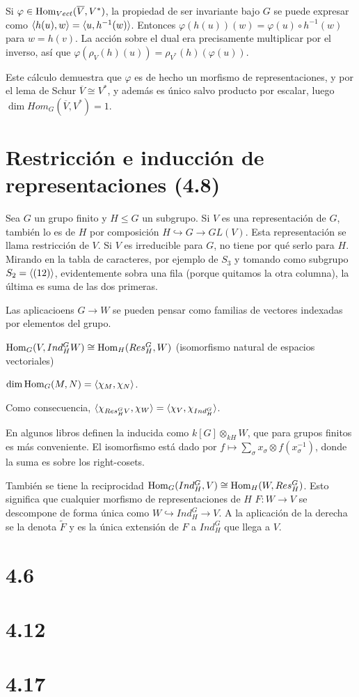 \documentclass[ANAyTR.tex]{subfiles}
\begin{document}
Si $\varphi\in\operatorname{Hom}_{Vect}(\overline{V},V^*)$, la propiedad de ser invariante bajo $G$ se puede expresar como $\langle{h(u),w}\rangle=\langle{u,h^{-1}(w)}\rangle$. Entonces $\varphi(h(u))(w)=\varphi(u)\circ h^{-1}(w)$ para $w=h(v)$.  La acción sobre el dual era precisamente multiplicar por el inverso, así que $\varphi(\rho_V(h)(u))=\rho_{V^*}(h)(\varphi(u))$. 

Este cálculo demuestra que $\varphi$ es de hecho un morfismo de representaciones, y por el lema de Schur $\overline{V}\cong V^*$, y además es único salvo producto por escalar, luego $\dim Hom_G(\overline{V},V^*)=1$. 

\section{Restricción e inducción de representaciones (4.8)}
Sea $G$ un grupo finito y $H\leq G$ un subgrupo. Si $V$ es una representación de $G$, también lo es de $H$ por composición $H\hookrightarrow G\to GL(V)$. Esta representación se llama restricción de $V$. Si $V$ es irreducible para $G$, no tiene por qué serlo para $H$. Mirando en la tabla de caracteres, por ejemplo de $S_3$ y tomando como subgrupo $S_2=\langle{(12)}\rangle$, evidentemente sobra una fila (porque quitamos la otra columna), la última es suma de las dos primeras. 

Las aplicacioens $G\to W$ se pueden pensar como familias de vectores indexadas por elementos del grupo. 


\begin{teorema}
$\operatorname{Hom}_G(V,Ind^G_HW)\cong \operatorname{Hom}_H(Res^G_H,W)$ (isomorfismo natural de espacios vectoriales)
\end{teorema}
$\dim \operatorname{Hom}_G(M,N)=\langle{\chi_M,\chi_N}\rangle$. 

Como consecuencia, $\langle{\chi_{Res^G_H V},\chi_W}\rangle=\langle{\chi_V,\chi_{Ind^G_H}}\rangle$. 

En algunos libros definen la inducida como $k[G]\otimes_{kH}W$, que para grupos finitos es más conveniente. El isomorfismo está dado por $f\mapsto \sum_{\sigma} x_\sigma\otimes f(x_\sigma^{-1})$, donde la suma es sobre los right-cosets.
 
 
 También se tiene la reciprocidad $\operatorname{Hom}_G(Ind^G_H,V)\cong\operatorname{Hom}_H(W,Res^G_H)$. Esto significa que cualquier morfismo de representaciones de $H$ $F:W\to V$ se descompone de forma única como $W\hookrightarrow Ind^G_H \to V$. A la aplicación de la derecha se la denota $\tilde{F}$ y es la única extensión de $F$ a $Ind^G_H$ que llega a $V$. 
\section{4.6}

\section{4.12}

\section{4.17}
\end{document}
